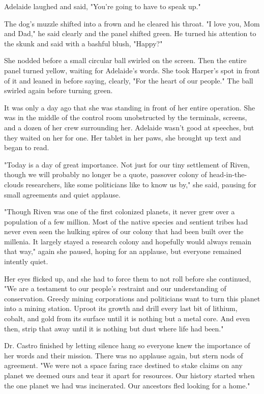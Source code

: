 Adelaide laughed and said, "You're going to have to speak up."

The dog's muzzle shifted into a frown and he cleared his throat. "I love you, Mom and Dad," he said clearly and the panel shifted green. He turned his attention to the skunk and said with a bashful blush, "Happy?"

She nodded before a small circular ball swirled on the screen. Then the entire panel turned yellow, waiting for Adelaide's words. She took Harper's spot in front of it and leaned in before saying, clearly, "For the heart of our people." The ball swirled again before turning green.

\secdiv

It was only a day ago that she was standing in front of her entire operation. She was in the middle of the control room unobstructed by the terminals, screens, and a dozen of her crew surrounding her. Adelaide wasn't good at speeches, but they waited on her for one. Her tablet in her paws, she brought up text and began to read.

"Today is a day of great importance. Not just for our tiny settlement of Riven, though we will probably no longer be a quote, passover colony of head-in-the-clouds researchers, like some politicians like to know us by," she said, pausing for small agreements and quiet applause.

"Though Riven was one of the first colonized planets, it never grew over a population of a few million. Most of the native species and sentient tribes had never even seen the hulking spires of our colony that had been built over the millenia. It largely stayed a research colony and hopefully would always remain that way," again she paused, hoping for an applause, but everyone remained intently quiet.

Her eyes flicked up, and she had to force them to not roll before she continued, "We are a testament to our people's restraint and our understanding of conservation. Greedy mining corporations and politicians want to turn this planet into a mining station. Uproot its growth and drill every last bit of lithium, cobalt, and gold from its surface until it is nothing but a metal core. And even then, strip that away until it is nothing but dust where life had been."

Dr. Castro finished by letting silence hang so everyone knew the importance of her words and their mission. There was no applause again, but stern nods of agreement. "We were not a space faring race destined to stake claims on any planet we deemed ours and tear it apart for resources. Our history started when the one planet we had was incinerated. Our ancestors fled looking for a home."

